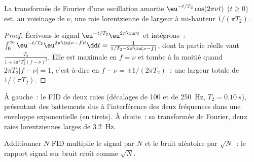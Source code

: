 \begin{theorem}\label{thm:b3:advanced-nmr:lorentzian}
La transformée de Fourier d'une oscillation amortie $\eu^{-t/T_2}\cos(2\pi\nu t)$ ($t \ge 0$) est,
au voisinage de $\nu$, une raie lorentzienne de largeur à mi-hauteur
$1/(\pi T_2)$.
\end{theorem}

\begin{proof}
Écrivons le signal $\eu^{-t/T_2}\eu^{2\pi\iu\nu t}$ et intégrons~:
$\int_0^\infty\eu^{-t/T_2}\eu^{2\pi\iu(\nu - f)t}\dd t = \frac{1}{1/T_2 - 2\pi\iu(\nu - f)}$,
dont la partie réelle vaut $\frac{T_2}{1 + 4\pi^2T_2^2(f - \nu)^2}$. Elle
est maximale en $f = \nu$ et tombe à la moitié quand
$2\pi T_2|f - \nu| = 1$, c'est-à-dire en $f - \nu = \pm1/(2\pi T_2)$~:
une largeur totale de
$1/(\pi T_2)$.
\end{proof}

\begin{omfigure}

{\small À gauche~: le FID de deux raies (décalages de 100 et de
\qty{250}{Hz}, $T_2 = \qty{0.10}{s}$), présentant des battements dus à
l'interférence des deux fréquences dans une enveloppe exponentielle (en
tirets). À droite~: sa transformée de Fourier, deux raies lorentziennes
larges de \qty{3.2}{Hz}.}
\end{omfigure}

\begin{proposition}\label{prop:b3:advanced-nmr:averaging}
Additionner $N$ FID multiplie le signal par $N$ et le bruit aléatoire par
$\sqrt N$~: le rapport signal sur bruit croît comme $\sqrt N$.
\end{proposition}

